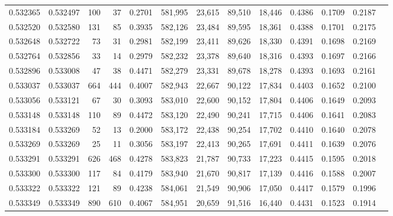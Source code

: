 \begin{tabular}{rrrrrrrrrrrrr}
0.532365 & 0.532497 &   100 &    37 &                                     0.2701 & 581,995 &  23,615 &  89,510 &  18,446 & 0.4386 & 0.1709 & 0.2187 \\
0.532520 & 0.532580 &   131 &    85 &                                     0.3935 & 582,126 &  23,484 &  89,595 &  18,361 & 0.4388 & 0.1701 & 0.2175 \\
0.532648 & 0.532722 &    73 &    31 &                                     0.2981 & 582,199 &  23,411 &  89,626 &  18,330 & 0.4391 & 0.1698 & 0.2169 \\
0.532764 & 0.532856 &    33 &    14 &                                     0.2979 & 582,232 &  23,378 &  89,640 &  18,316 & 0.4393 & 0.1697 & 0.2166 \\
0.532896 & 0.533008 &    47 &    38 &                                     0.4471 & 582,279 &  23,331 &  89,678 &  18,278 & 0.4393 & 0.1693 & 0.2161 \\
0.533037 & 0.533037 &   664 &   444 &                                     0.4007 & 582,943 &  22,667 &  90,122 &  17,834 & 0.4403 & 0.1652 & 0.2100 \\
0.533056 & 0.533121 &    67 &    30 &                                     0.3093 & 583,010 &  22,600 &  90,152 &  17,804 & 0.4406 & 0.1649 & 0.2093 \\
0.533148 & 0.533148 &   110 &    89 &                                     0.4472 & 583,120 &  22,490 &  90,241 &  17,715 & 0.4406 & 0.1641 & 0.2083 \\
0.533184 & 0.533269 &    52 &    13 &                                     0.2000 & 583,172 &  22,438 &  90,254 &  17,702 & 0.4410 & 0.1640 & 0.2078 \\
0.533269 & 0.533269 &    25 &    11 &                                     0.3056 & 583,197 &  22,413 &  90,265 &  17,691 & 0.4411 & 0.1639 & 0.2076 \\
0.533291 & 0.533291 &   626 &   468 &                                     0.4278 & 583,823 &  21,787 &  90,733 &  17,223 & 0.4415 & 0.1595 & 0.2018 \\
0.533300 & 0.533300 &   117 &    84 &                                     0.4179 & 583,940 &  21,670 &  90,817 &  17,139 & 0.4416 & 0.1588 & 0.2007 \\
0.533322 & 0.533322 &   121 &    89 &                                     0.4238 & 584,061 &  21,549 &  90,906 &  17,050 & 0.4417 & 0.1579 & 0.1996 \\
0.533349 & 0.533349 &   890 &   610 &                                     0.4067 & 584,951 &  20,659 &  91,516 &  16,440 & 0.4431 & 0.1523 & 0.1914 \\

\end{tabular}
